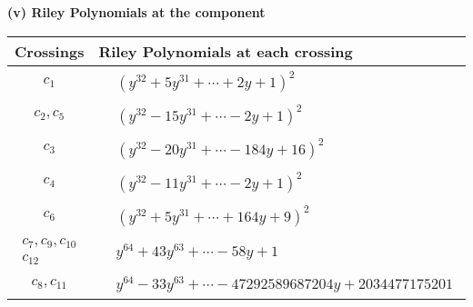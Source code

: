 \documentclass[1p]{elsarticle_modified}
\theoremstyle{definition}
\begin{document}
\newpage\renewcommand{\arraystretch}{1}
\flushleft \textbf{(v) Riley Polynomials at the component}\newline \\
\begin{tabular}{m{50pt}|m{274pt}}
Crossings & \hspace{64pt}Riley Polynomials at each crossing \\
\hline $$\begin{aligned}c_{1}\end{aligned}$$&$\begin{aligned}
&(y^{32}+5 y^{31}+\cdots+2 y+1)^{2}
\end{aligned}$\\
\hline $$\begin{aligned}c_{2},c_{5}\end{aligned}$$&$\begin{aligned}
&(y^{32}-15 y^{31}+\cdots-2 y+1)^{2}
\end{aligned}$\\
\hline $$\begin{aligned}c_{3}\end{aligned}$$&$\begin{aligned}
&(y^{32}-20 y^{31}+\cdots-184 y+16)^{2}
\end{aligned}$\\
\hline $$\begin{aligned}c_{4}\end{aligned}$$&$\begin{aligned}
&(y^{32}-11 y^{31}+\cdots-2 y+1)^{2}
\end{aligned}$\\
\hline $$\begin{aligned}c_{6}\end{aligned}$$&$\begin{aligned}
&(y^{32}+5 y^{31}+\cdots+164 y+9)^{2}
\end{aligned}$\\
\hline $$\begin{aligned}c_{7},c_{9},c_{10}\\c_{12}\end{aligned}$$&$\begin{aligned}
&y^{64}+43 y^{63}+\cdots-58 y+1
\end{aligned}$\\
\hline $$\begin{aligned}c_{8},c_{11}\end{aligned}$$&$\begin{aligned}
&y^{64}-33 y^{63}+\cdots-47292589687204 y+2034477175201
\end{aligned}$\\
\hline
\end{tabular}\\~\\
\end{document}
